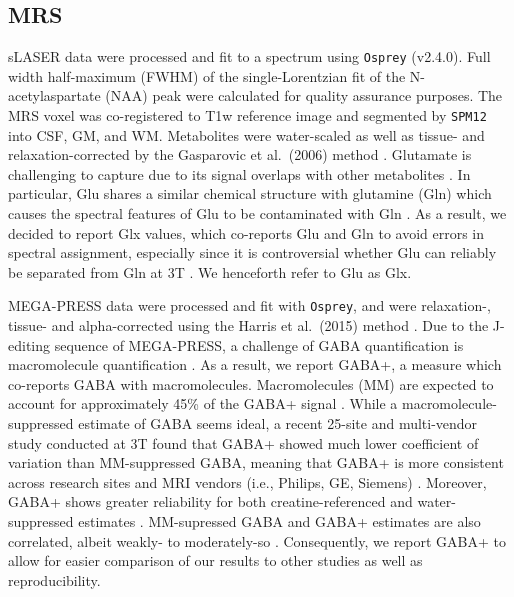 \documentclass[
true
]{sn-jnl}
\begin{document}
\subsection{MRS}\label{mrs}

sLASER data were processed and fit to a spectrum using \texttt{Osprey}
\citep{oeltzschnerOspreyOpenSourceProcessing2020} (v2.4.0). Full width
half-maximum (FWHM) of the single-Lorentzian fit of the
N-acetylaspartate (NAA) peak were calculated for quality assurance
purposes. The MRS voxel was co-registered to T1w reference image and
segmented by \texttt{SPM12}
\citep{fristonStatisticalParametricMapping2007} into CSF, GM, and WM.
Metabolites were water-scaled as well as tissue- and
relaxation-corrected by the Gasparovic et al.~(2006) method
\citep{gasparovicUseTissueWater2006}. Glutamate is challenging to
capture due to its signal overlaps with other metabolites
\citep{pasantaFunctionalMRSStudies2023}. In particular, Glu shares a
similar chemical structure with glutamine (Gln) which causes the
spectral features of Glu to be contaminated with Gln
\citep{ramadanGlutamateGlutamineReview2013}. As a result, we decided to
report Glx values, which co-reports Glu and Gln to avoid errors in
spectral assignment, especially since it is controversial whether Glu
can reliably be separated from Gln at 3T
\citep{zollnerComparisonDifferentLinearcombination2021, zollnerComparisonLinearCombination2022}.
We henceforth refer to Glu as Glx.

MEGA-PRESS data were processed and fit with \texttt{Osprey}, and were
relaxation-, tissue- and alpha-corrected using the Harris et al.~(2015)
method \citep{harrisSpectralEditingMeasurementsGABA2015}. Due to the
J-editing sequence of MEGA-PRESS, a challenge of GABA quantification is
macromolecule quantification
\citep{harrisSpectralEditingMeasurementsGABA2015}. As a result, we
report GABA+, a measure which co-reports GABA with macromolecules.
Macromolecules (MM) are expected to account for approximately 45\% of
the GABA+ signal \citep{harrisSpectralEditingMeasurementsGABA2015}.
While a macromolecule-suppressed estimate of GABA seems ideal, a recent
25-site and multi-vendor study conducted at 3T found that GABA+ showed
much lower coefficient of variation than MM-suppressed GABA, meaning
that GABA+ is more consistent across research sites and MRI vendors
(i.e., Philips, GE, Siemens) \citep{mikkelsenBigGABAII2019}. Moreover,
GABA+ shows greater reliability for both creatine-referenced and
water-suppressed estimates
\citep{mikkelsenBigGABAEdited2017, mikkelsenBigGABAII2019}. MM-supressed
GABA and GABA+ estimates are also correlated, albeit weakly- to
moderately-so
\citep{harrisSpectralEditingMeasurementsGABA2015, mikkelsenBigGABAII2019, mikkelsenBigGABAEdited2017}.
Consequently, we report GABA+ to allow for easier comparison of our
results to other studies as well as reproducibility.
\end{document}
